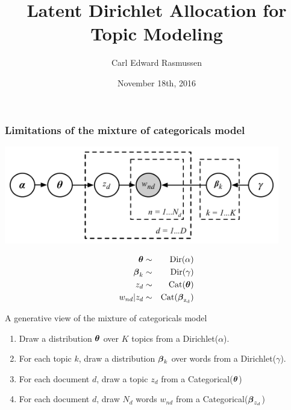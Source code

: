
\usepackage{bbm}

\title{Latent Dirichlet Allocation for Topic Modeling}
\author{Carl Edward Rasmussen}
\date{November 18th, 2016}




\begin{frame}
\titlepage
\end{frame}


\begin{frame}
\frametitle{Limitations of the mixture of categoricals model}

\begin{minipage}{0.7\linewidth}
\centerline{\includegraphics[width=0.9\textwidth]{bayes_mix_categorical_model}}
\end{minipage}
\begin{minipage}{0.29\linewidth}
\begin{eqnarray*}
\boldsymbol{\theta} & \sim& {\rm{Dir}}(\alpha)\\
\boldsymbol{\beta}_k & \sim &{ \rm{Dir}}(\gamma)\\
z_d & \sim & \rm{Cat}(\boldsymbol{\theta})\\
w_{nd} | z_d & \sim & \rm{Cat}(\boldsymbol{\beta}_{z_d})
\end{eqnarray*}
\end{minipage}


A generative view of the mixture of categoricals model
\begin{enumerate}
\item Draw a distribution $\boldsymbol{\theta}$ over $K$ topics from a Dirichlet($\alpha$).
\item For each topic $k$, draw a distribution $\boldsymbol{\beta}_k$ over words from a
  Dirichlet($\gamma$).
\item For each document $d$, draw a topic $z_d$ from a Categorical($\boldsymbol{\theta}$)
\item For each document $d$, draw $N_d$ words $w_{nd}$ from a Categorical($\boldsymbol{\beta}_{z_d}$)
\end{enumerate}


\end{frame}
